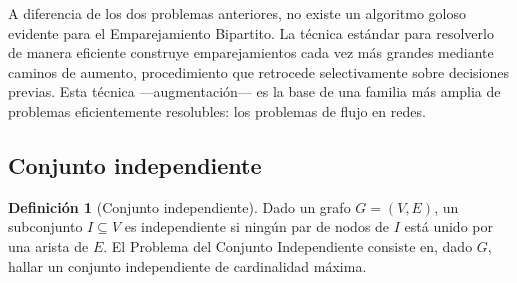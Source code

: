 \documentclass[12pt, spanish, oneside, openany]{book}
\theoremstyle{uprightplain}
\theoremstyle{definition}
\newtheorem{definicion}[teorema]{Definición}
\theoremstyle{remark}
\theoremstyle{definition}
\begin{document}
A diferencia de los dos problemas anteriores, no existe un algoritmo goloso evidente para el Emparejamiento Bipartito. La técnica estándar para resolverlo de manera eficiente construye emparejamientos cada vez más grandes mediante caminos de aumento, procedimiento que retrocede selectivamente sobre decisiones previas. Esta técnica —augmentación— es la base de una familia más amplia de problemas eficientemente resolubles: los problemas de flujo en redes.

\subsection{Conjunto independiente}
\label{subsec:independent-set}

\begin{definicion}[Conjunto independiente]
\label{def:conjunto-independiente}
Dado un grafo $G=(V,E)$, un subconjunto $I \subseteq V$ es independiente si ningún par de nodos de $I$ está unido por una arista de $E$. El Problema del Conjunto Independiente consiste en, dado $G$, hallar un conjunto independiente de cardinalidad máxima.
\end{definicion}
\end{document}
